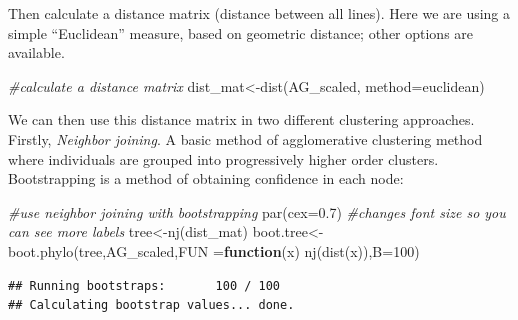 \documentclass[
]{book}
\newenvironment{Shaded}{\begin{snugshade}}{\end{snugshade}}
\newcommand{\AttributeTok}[1]{\textcolor[rgb]{0.77,0.63,0.00}{#1}}
\newcommand{\CommentTok}[1]{\textcolor[rgb]{0.56,0.35,0.01}{\textit{#1}}}
\newcommand{\ControlFlowTok}[1]{\textcolor[rgb]{0.13,0.29,0.53}{\textbf{#1}}}
\newcommand{\DecValTok}[1]{\textcolor[rgb]{0.00,0.00,0.81}{#1}}
\newcommand{\FloatTok}[1]{\textcolor[rgb]{0.00,0.00,0.81}{#1}}
\newcommand{\FunctionTok}[1]{\textcolor[rgb]{0.00,0.00,0.00}{#1}}
\newcommand{\NormalTok}[1]{#1}
\newcommand{\OtherTok}[1]{\textcolor[rgb]{0.56,0.35,0.01}{#1}}
\newcommand{\SpecialCharTok}[1]{\textcolor[rgb]{0.00,0.00,0.00}{#1}}
\newcommand{\StringTok}[1]{\textcolor[rgb]{0.31,0.60,0.02}{#1}}
\begin{document}
\begin{Shaded}
\end{Shaded}

Then calculate a distance matrix (distance between all lines). Here we are using a simple ``Euclidean'' measure, based on geometric distance; other options are available.

\begin{Shaded}
\begin{Highlighting}[]
\CommentTok{\#calculate a distance matrix}
\NormalTok{dist\_mat}\OtherTok{\textless{}{-}}\FunctionTok{dist}\NormalTok{(AG\_scaled, }\AttributeTok{method=}\StringTok{\textquotesingle{}euclidean\textquotesingle{}}\NormalTok{)}
\end{Highlighting}
\end{Shaded}

We can then use this distance matrix in two different clustering approaches. Firstly, \emph{Neighbor joining}. A basic method of agglomerative clustering method where individuals are grouped into progressively higher order clusters. Bootstrapping is a method of obtaining confidence in each node:

\begin{Shaded}
\begin{Highlighting}[]
\CommentTok{\#use neighbor joining with bootstrapping}
\FunctionTok{par}\NormalTok{(}\AttributeTok{cex=}\FloatTok{0.7}\NormalTok{) }\CommentTok{\#changes font size so you can see more labels}
\NormalTok{tree}\OtherTok{\textless{}{-}}\FunctionTok{nj}\NormalTok{(dist\_mat)}
\NormalTok{boot.tree}\OtherTok{\textless{}{-}}\FunctionTok{boot.phylo}\NormalTok{(tree,AG\_scaled,}\AttributeTok{FUN =}\ControlFlowTok{function}\NormalTok{(x) }\FunctionTok{nj}\NormalTok{(}\FunctionTok{dist}\NormalTok{(x)),}\AttributeTok{B=}\DecValTok{100}\NormalTok{)}
\end{Highlighting}
\end{Shaded}

\begin{verbatim}
## Running bootstraps:       100 / 100
## Calculating bootstrap values... done.
\end{verbatim}
\end{document}
